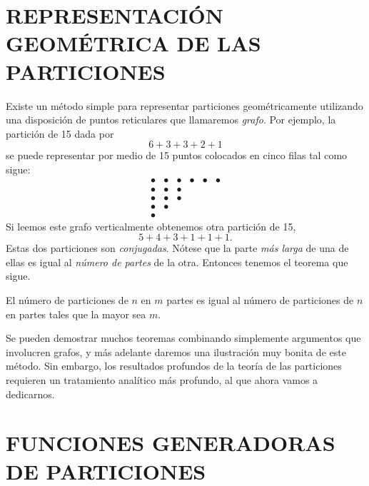     \section{REPRESENTACIÓN GEOMÉTRICA DE LAS PARTICIONES}

    Existe un método simple para representar particiones geométricamente utilizando una
    disposición de puntos reticulares que llamaremos \textit{grafo}. Por ejemplo, la partición
    de 15 dada por
    \begin{equation*}
        6+3+3+2+1
    \end{equation*}
    se puede representar por medio de 15 puntos colocados en cinco filas tal como sigue:
    \begin{equation*}
        \begin{array}{cccccc}
            \bullet&\bullet&\bullet&\bullet&\bullet&\bullet\\
            \bullet&\bullet&\bullet&&&\\
            \bullet&\bullet&\bullet&&&\\
            \bullet&\bullet&&&&\\
            \bullet&&&&&
        \end{array}
    \end{equation*}
    Si leemos este grafo verticalmente obtenemos otra partición de 15,
    \begin{equation*}
        5+4+3+1+1+1.
    \end{equation*}
    Estas dos particiones son \textit{conjugadas}. Nótese que la parte \textit{más larga} de una
    de ellas es igual al \textit{número de partes} de la otra. Entonces tenemos el teorema que
    sigue.

    \begin{teorema}\label{teo:14-1}
        El número de particiones de $n$ en $m$ partes es igual al número de particiones de $n$
        en partes tales que la mayor sea $m$.
    \end{teorema}

    Se pueden demostrar muchos teoremas combinando simplemente argumentos que involucren
    grafos, y más adelante daremos una ilustración muy bonita de este método. Sin embargo, los
    resultados profundos de la teoría de las particiones requieren un tratamiento analítico más
    profundo, al que ahora vamos a dedicarnos.

    \section{FUNCIONES GENERADORAS DE PARTICIONES}

